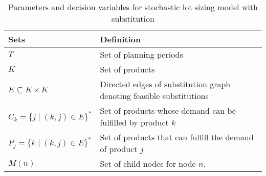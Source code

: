 \documentclass[10pt]{article}
\newcommand{\TI}{T}
\newcommand{\ka}{k} %
\newcommand{\KA}{K}
\newcommand{\jey}{j} %
\begin{document}
\begin{table}[H]
\centering
\caption{Parameters and decision variables for stochastic lot sizing model with substitution}
\begin{adjustbox}{width=1\textwidth,center=\textwidth}
\begin{tabular}{ll}
\toprule
{\bf Sets} & {\bf Definition} \\ \midrule
$\TI$  & Set of planning periods \\ 
$\KA$  & Set of products \\
$E \subseteq \KA \times \KA$  & Directed edges of substitution graph denoting feasible substitutions
\\
$ C_{k} = \{j \mid (k,j) \in E\}^*$  & Set of products whose demand can be fulfilled by product $\ka$  \\
$ P_{j} = \{k \mid (k,j) \in E\}^*$  & Set of products that can fulfill the demand of product $j$ \\
$ M(n) $  & Set of child nodes for node $n$. \\


\end{tabular}
\end{adjustbox}
\end{table}
\end{document}

